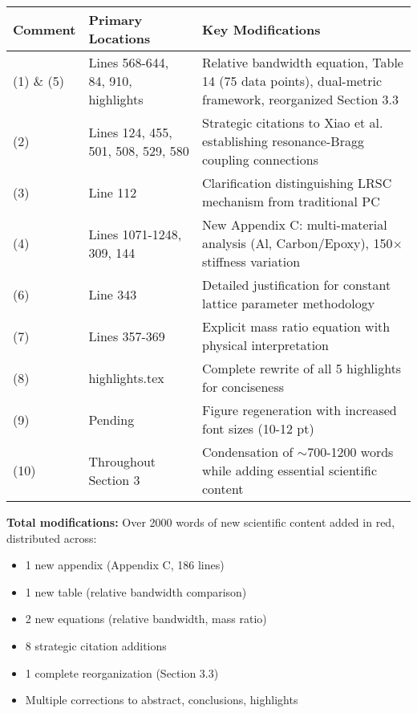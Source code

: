 \documentclass[11pt,a4paper]{article}
\begin{document}
\begin{table}[h]
\centering
\small
\begin{tabular}{|p{2cm}|p{4cm}|p{7cm}|}
\hline
\textbf{Comment} & \textbf{Primary Locations} & \textbf{Key Modifications} \\
\hline
(1) \& (5) & Lines 568-644, 84, 910, highlights & Relative bandwidth equation, Table 14 (75 data points), dual-metric framework, reorganized Section 3.3 \\
\hline
(2) & Lines 124, 455, 501, 508, 529, 580 & Strategic citations to Xiao et al. establishing resonance-Bragg coupling connections \\
\hline
(3) & Line 112 & Clarification distinguishing LRSC mechanism from traditional PC \\
\hline
(4) & Lines 1071-1248, 309, 144 & New Appendix C: multi-material analysis (Al, Carbon/Epoxy), 150$\times$ stiffness variation \\
\hline
(6) & Line 343 & Detailed justification for constant lattice parameter methodology \\
\hline
(7) & Lines 357-369 & Explicit mass ratio equation with physical interpretation \\
\hline
(8) & highlights.tex & Complete rewrite of all 5 highlights for conciseness \\
\hline
(9) & Pending & Figure regeneration with increased font sizes (10-12 pt) \\
\hline
(10) & Throughout Section 3 & Condensation of $\sim$700-1200 words while adding essential scientific content \\
\hline
\end{tabular}
\end{table}

\textbf{Total modifications:} Over 2000 words of new scientific content added in red, distributed across:
\begin{itemize}
    \item 1 new appendix (Appendix C, 186 lines)
    \item 1 new table (relative bandwidth comparison)
    \item 2 new equations (relative bandwidth, mass ratio)
    \item 8 strategic citation additions
    \item 1 complete reorganization (Section 3.3)
    \item Multiple corrections to abstract, conclusions, highlights
\end{itemize}
\end{document}

